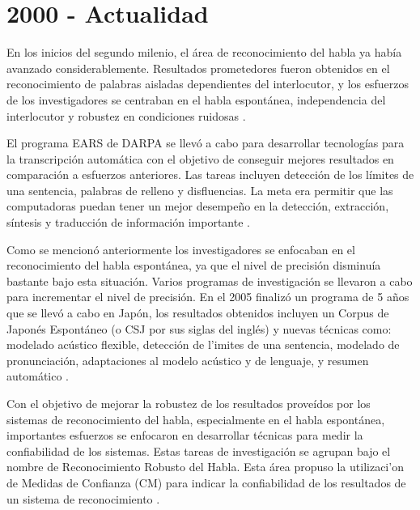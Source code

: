 \section{2000 - Actualidad}
\label{sec:post2000s}


En los inicios del segundo milenio, el \'{a}rea de reconocimiento del habla ya hab\'{i}a avanzado 
considerablemente. Resultados prometedores fueron obtenidos en el reconocimiento de palabras aisladas
dependientes del interlocutor, y los esfuerzos de los investigadores se centraban en el habla espont\'{a}nea,
independencia del interlocutor y robustez en condiciones ruidosas \cite{RonzhinSurvey2006}.

El programa EARS de DARPA se llev\'{o} a cabo para desarrollar tecnolog\'{i}as para la transcripci\'{o}n autom\'{a}tica
con el objetivo de conseguir mejores resultados en comparaci\'{o}n a esfuerzos anteriores. Las tareas incluyen detecci\'{o}n
de los l\'{i}mites de una sentencia, palabras de relleno y disfluencias. La meta era permitir que las computadoras puedan
tener un mejor desempe\~{n}o en la detecci\'{o}n, extracci\'{o}n, s\'{i}ntesis y traducci\'{o}n de informaci\'{o}n 
importante \cite{LiuStructural2005, SoltauTheIBM2005}.

Como se mencion\'{o} anteriormente los investigadores se enfocaban en el reconocimiento del habla espont\'{a}nea, ya que el 
nivel de precisi\'{o}n disminu\'{i}a bastante bajo esta situaci\'{o}n. Varios programas de investigaci\'{o}n se 
llevaron a cabo para incrementar el nivel de precisi\'{o}n. En el 2005 finaliz\'{o} un programa de 5 a\~{n}os que se llev\'{o} a 
cabo en Jap\'{o}n, los resultados obtenidos incluyen un Corpus de Japon\'{e}s Espont\'{a}neo (o CSJ por sus siglas
del ingl\'{e}s) y nuevas t\'{e}cnicas como: modelado ac\'{u}stico flexible, detecci\'{o}n de l'{i}mites de una
sentencia, modelado de pronunciaci\'{o}n, adaptaciones al modelo ac\'{u}stico y de lenguaje, y
resumen autom\'{a}tico \cite{FuruiRecent2005}.

Con el objetivo de mejorar la robustez de los resultados prove\'{i}dos por los sistemas de reconocimiento del habla, especialmente
en el habla espont\'{a}nea, importantes esfuerzos se enfocaron en desarrollar t\'{e}cnicas para medir la confiabilidad de los
sistemas. Estas tareas de investigaci\'{o}n se agrupan bajo el nombre de Reconocimiento Robusto del Habla. Esta \'{a}rea
propuso la utilizaci'{o}n de Medidas de Confianza (CM) para indicar la confiabilidad de los resultados de un 
sistema de reconocimiento \cite{JiangConfidence2005}.

